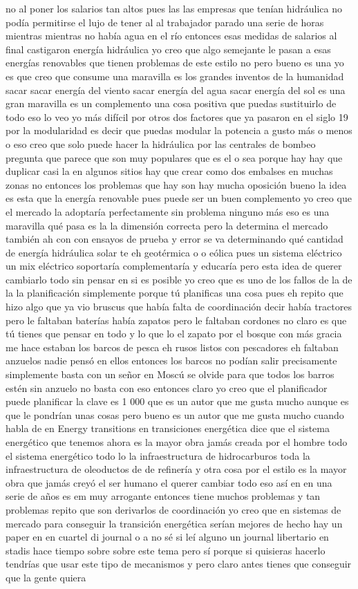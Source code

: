 no al poner los salarios tan altos pues las las empresas que tenían hidráulica no podía permitirse el lujo de tener al al trabajador parado una serie de horas mientras mientras no había agua en el río entonces esas medidas de salarios al final castigaron energía hidráulica yo creo que algo semejante le pasan a esas energías renovables que tienen problemas de este estilo no pero bueno es una yo es que creo que consume una maravilla es los grandes inventos de la humanidad sacar sacar energía del viento sacar energía del agua sacar energía del sol es una gran maravilla es un complemento una cosa positiva que puedas sustituirlo de todo eso lo veo yo más difícil por otros dos factores que ya pasaron en el siglo 19 por la modularidad es decir que puedas modular la potencia a gusto más o menos o eso creo que solo puede hacer la hidráulica por las centrales de bombeo pregunta que parece que son muy populares que es el o sea porque hay hay que duplicar casi la en algunos sitios hay que crear como dos embalses en muchas zonas no entonces los problemas que hay son hay mucha oposición bueno la idea es esta que la energía renovable pues puede ser un buen complemento yo creo que el mercado la adoptaría perfectamente sin problema ninguno más eso es una maravilla qué pasa es la la dimensión correcta pero la determina el mercado también ah con con ensayos de prueba y error se va determinando qué cantidad de energía hidráulica solar te eh geotérmica o o eólica pues un sistema eléctrico un mix eléctrico soportaría complementaría y educaría pero esta idea de querer cambiarlo todo sin pensar en si es posible yo creo que es uno de los fallos de la de la la planificación simplemente porque tú planificas una cosa pues eh repito que hizo algo que ya vio bruscus que había falta de coordinación decir había tractores pero le faltaban baterías había zapatos pero le faltaban cordones no claro es que tú tienes que pensar en todo y lo que lo el zapato por el bosque con más gracia me hace estaban los barcos de pesca eh rusos listos con pescadores eh faltaban anzuelos nadie pensó en ellos entonces los barcos no podían salir precisamente simplemente basta con un señor en Moscú se olvide para que todos los barros estén sin anzuelo no basta con eso entonces claro yo creo que el planificador puede planificar la clave es 1 000 que es un autor que me gusta mucho aunque es que le pondrían unas cosas pero bueno es un autor que me gusta mucho cuando habla de en Energy transitions en transiciones energética dice que el sistema energético que tenemos ahora es la mayor obra jamás creada por el hombre todo el sistema energético todo lo la infraestructura de hidrocarburos toda la infraestructura de oleoductos de de refinería y otra cosa por el estilo es la mayor obra que jamás creyó el ser humano el querer cambiar todo eso así en en una serie de años es em muy arrogante entonces tiene muchos problemas y tan problemas repito que son derivarlos de coordinación yo creo que en sistemas de mercado para conseguir la transición energética serían mejores de hecho hay un paper en en cuartel di journal o a no sé si leí alguno un journal libertario en stadis hace tiempo sobre sobre este tema pero sí porque si quisieras hacerlo tendrías que usar este tipo de mecanismos y pero claro antes tienes que conseguir que la gente quiera 